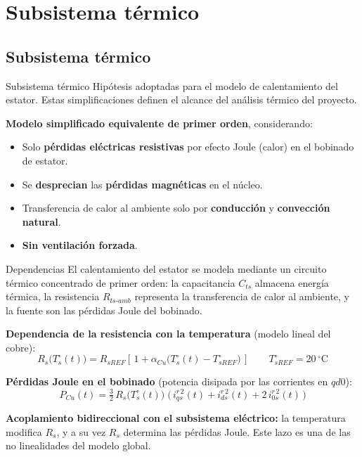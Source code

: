 \documentclass[aspectratio=169,t]{beamer}
\newcommand{\SecPresentacion}{Presentación del problema}
\newcommand{\SecMecanico}{Subsistema mecánico equivalente}
\newcommand{\SecElectromagnetico}{Subsistema electromagnético en coordenadas qd0}
\newcommand{\SecTermico}{Subsistema térmico}
\newcommand{\SecNLGlobal}{Sistema No Lineal Global}
\newcommand{\SecLPV}{Linealización Jacobiana (LPV)}
\newcommand{\SecLTI}{Obtención del modelo LTI equivalente}
\newcommand{\SecAnalisisLTI}{Análisis del modelo LTI aumentado}
\newcommand{\SecDinamica}{Respuesta dinámica en dominio del tiempo}
\newcommand{\SecControlador}{Diseño y análisis del controlador en cascada}
\newcommand{\SecVerifSpecs}{Verificación de desempeño: Especificaciones de operación}
\newcommand{\SecVerifOffset}{Verificación de desempeño: Offset de estado estacionario}
\newcommand{\SecVerifNoIdealidades}{Verificación de desempeño: No idealidades y comportamiento térmico}
\newcommand{\SecDiscretizacion}{Discretización del controlador}
\newcommand{\SecSoftware}{Codificación del software de control}
\newcommand{\AgendaItem}[3]{%
  \ifnum#1=#2
    {\scriptsize\bfseries\color{uncBlue}%
      \hyperlink{sec:#1}{\makebox[2.2em][r]{#1.}\hspace{0.7em}%
      \parbox[t]{0.86\textwidth}{#3}}\par}%
  \else
    {\scriptsize\color{black!26}%
      \hyperlink{sec:#1}{\makebox[2.2em][r]{#1.}\hspace{0.7em}%
      \parbox[t]{0.86\textwidth}{#3}}\par}%
  \fi
  \vspace{0.35mm}%
}
\newcommand{\AgendaBody}[1]{%
    \vspace{3mm}
    {\Large\bfseries\color{uncBlue}Tabla de contenidos\par}
    \vspace{2mm}
    \begin{minipage}{0.94\textwidth}
      \AgendaItem{1}{#1}{\SecPresentacion}
      \AgendaItem{2}{#1}{\SecMecanico}
      \AgendaItem{3}{#1}{\SecElectromagnetico}
      \AgendaItem{4}{#1}{\SecTermico}
      \AgendaItem{5}{#1}\SecNLGlobal
      \AgendaItem{6}{#1}{\SecLPV}
      \AgendaItem{7}{#1}{\SecLTI}
      \AgendaItem{8}{#1}{\SecAnalisisLTI}
      \AgendaItem{9}{#1}{\SecDinamica}
      \AgendaItem{10}{#1}{\SecControlador}
      \AgendaItem{11}{#1}{\SecVerifSpecs}
      \AgendaItem{12}{#1}{\SecVerifOffset}
      \AgendaItem{13}{#1}{\SecVerifNoIdealidades}
      \AgendaItem{14}{#1}{\SecDiscretizacion}
      \AgendaItem{15}{#1}{\SecSoftware}
    \end{minipage}
    \vfill
}
\newcommand{\AgendaSlideTarget}[2]{%
  \begin{frame}[plain]
    \hypertarget{#2}{}%
    \AgendaBody{#1}
  \end{frame}
}
\newcommand{\StartProjectSection}[2]{%
  \section{#2}%
  \subsection{#2}%
  \AgendaSlideTarget{#1}{sec:#1}%
}
\begin{document}
\StartProjectSection{4}{\SecTermico}
\begin{frame}{Subsistema térmico}
{\small\color{uncGray}Hipótesis adoptadas para el modelo de calentamiento del estator. Estas simplificaciones definen el alcance del análisis térmico del proyecto.}\par
\vspace{6mm}

\textbf{Modelo simplificado equivalente de primer orden}, considerando:
\begin{itemize}
\item Solo \textbf{pérdidas eléctricas resistivas} por efecto Joule (calor) en el bobinado de estator.
\item Se \textbf{desprecian} las \textbf{pérdidas magnéticas} en el núcleo.
\item Transferencia de calor al ambiente solo por \textbf{conducción} y \textbf{convección natural}.
\item \textbf{Sin ventilación forzada}.
\end{itemize}
\end{frame}

\begin{frame}{Dependencias}
{\small\color{uncGray}El calentamiento del estator se modela mediante un circuito térmico concentrado de primer orden: la capacitancia $C_{ts}$ almacena energía térmica, la resistencia $R_{ts\text{-}amb}$ representa la transferencia de calor al ambiente, y la fuente son las pérdidas Joule del bobinado.}\par
\vspace{4mm}

\textbf{Dependencia de la resistencia con la temperatura} (modelo lineal del cobre):
\begin{equation*}
R_s\!\big(T_s^\circ(t)\big) = R_{sREF}\!\left[\,1 + \alpha_{Cu}\!\big(T_s^\circ(t) - T_{sREF}^\circ\big)\,\right]
\qquad T_{sREF}^\circ = 20\,^\circ\text{C}
\end{equation*}

\textbf{Pérdidas Joule en el bobinado} (potencia disipada por las corrientes en $qd0$):
\begin{equation*}
P_{Cu}(t) = \tfrac{3}{2}\,R_s\!\big(T_s^\circ(t)\big)\;\big(\,i_{qs}^{r\,2}(t) + i_{ds}^{r\,2}(t) + 2\,i_{0s}^{r\,2}(t)\,\big)
\end{equation*}

\vspace{2mm}
{\small \textbf{Acoplamiento bidireccional con el subsistema eléctrico:} la temperatura modifica $R_s$, y a su vez $R_s$ determina las pérdidas Joule. Este lazo es una de las no linealidades del modelo global.}
\end{frame}
\end{document}
